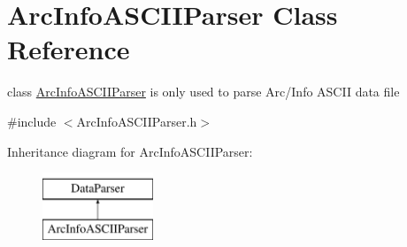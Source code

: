 \hypertarget{classArcInfoASCIIParser}{\section{\-Arc\-Info\-A\-S\-C\-I\-I\-Parser \-Class \-Reference}
\label{classArcInfoASCIIParser}
}


class \hyperlink{classArcInfoASCIIParser}{\-Arc\-Info\-A\-S\-C\-I\-I\-Parser} is only used to parse \-Arc/\-Info \-A\-S\-C\-I\-I data file  




{\ttfamily \#include $<$\-Arc\-Info\-A\-S\-C\-I\-I\-Parser.\-h$>$}

\-Inheritance diagram for \-Arc\-Info\-A\-S\-C\-I\-I\-Parser\-:\begin{figure}[H]
\begin{center}
\leavevmode
\includegraphics[height=2.000000cm]{classArcInfoASCIIParser}
\end{center}
\end{figure}
